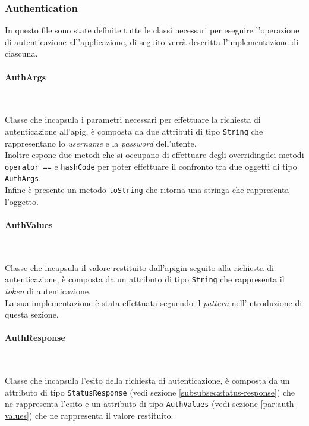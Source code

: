 \subsubsection*{Authentication}
\label{subsubsec:authentication}

In questo file sono state definite tutte le classi necessari per eseguire l'operazione di autenticazione all'applicazione, di seguito verrà descritta l'implementazione di ciascuna.

\paragraph*{AuthArgs} ~ \\
\label{par:auth-args}

\noindent Classe che incapsula i parametri necessari per effettuare la richiesta di autenticazione all'\gls{apig}\glsoccur, è composta da due attributi di tipo \lstinline{String} che rappresentano lo \emph{username} e la \emph{password} dell'utente.\\
Inoltre espone due metodi che si occupano di effettuare degli \gls{overriding}\glsoccur dei metodi \lstinline{operator ==}\cite{site:operator-equals} e \lstinline{hashCode}\cite{site:hascode-property} per poter effettuare il confronto tra due oggetti di tipo \lstinline{AuthArgs}.\\
Infine è presente un metodo \lstinline{toString} che ritorna una stringa che rappresenta l'oggetto.

\paragraph*{AuthValues} ~ \\
\label{par:auth-values}

\noindent Classe che incapsula il valore restituito dall'\gls{apig}\glsoccur in seguito alla richiesta di autenticazione, è composta da un attributo di tipo \lstinline{String} che rappresenta il \emph{token} di autenticazione.\\
La sua implementazione è stata effettuata seguendo il \emph{pattern} nell'introduzione di questa sezione.

\paragraph*{AuthResponse} ~ \\
\label{par:auth-response}

\noindent Classe che incapsula l'esito della richiesta di autenticazione, è composta da un attributo di tipo \lstinline{StatusResponse} (vedi sezione \ref{subsubsec:status-response}) che ne rappresenta l'esito e un attributo di tipo \lstinline{AuthValues} (vedi sezione \ref{par:auth-values}) che ne rappresenta il valore restituito.

